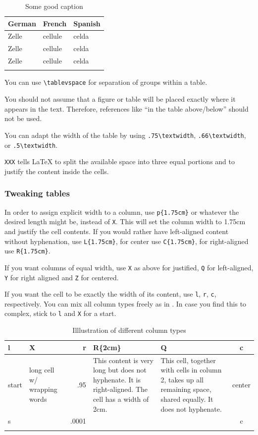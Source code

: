 \begin{table}[h]
  \begin{tabularx}{\textwidth}{XXX}
    \lsptoprule
    German  & French  & Spanish \\
    \midrule
    Zelle   & cellule & celda    \\
    Zelle   & cellule & celda    \\
    Zelle   & cellule & celda    \\
    \lspbottomrule
  \end{tabularx}
  \caption{Some good caption}
  \label{tab:chapterhandle:keytotable}
\end{table}

You can use \verb+\tablevspace+ for separation of groups within a table.

You should not assume that a figure or table will be placed exactly where it appears in the text. Therefore, references like ``in the table above/below'' should not be used.

You can adapt the width of the table by using \verb+.75\textwidth+,  \verb+.66\textwidth+, or \verb+.5\textwidth+.

\verb+XXX+ tells \LaTeX\xspace to split the available space into three equal portions and to justify the content inside the cells.

\subsubsection{Tweaking tables}
In order to assign explicit width to a column, use \verb+p{1.75cm}+ or whatever the desired length might be, instead of \verb+X+.
This will set the column width to 1.75cm and justify the cell contents. If you would rather have left-aligned content without hyphenation, use \verb+L{1.75cm}+, for center use \verb+C{1.75cm}+, for right-aligned use \verb+R{1.75cm}+.

If you want columns of equal width, use \verb+X+ as above for justified, \verb+Q+ for left-aligned, \verb+Y+ for right aligned and \verb+Z+ for centered.

If you want the cell to be exactly the width of its content, use \verb+l+, \verb+r+, \verb+c+, respectively. You can mix all column types freely as in . In case you find this to complex, stick to \verb+l+ and \verb+X+ for a start.

\begin{table}
 \begin{tabularx}{\textwidth}{lXrR{2cm}Qc}
\lsptoprule
l & X & r & R\{2cm\} & Q & c \\
\midrule
  start & long cell w/   wrapping words & .95 & This content is very long but does not hyphenate. It is right-aligned. The cell has a width of 2cm. & This cell, together with cells in column 2, takes up all remaining space, shared equally. It does not hyphenate. & center\\
s & & .0001 & &&  c \\
\lspbottomrule
\end{tabularx}
\caption{Illlustration of different column types}
\label{tab:colmixes}
\end{table}


